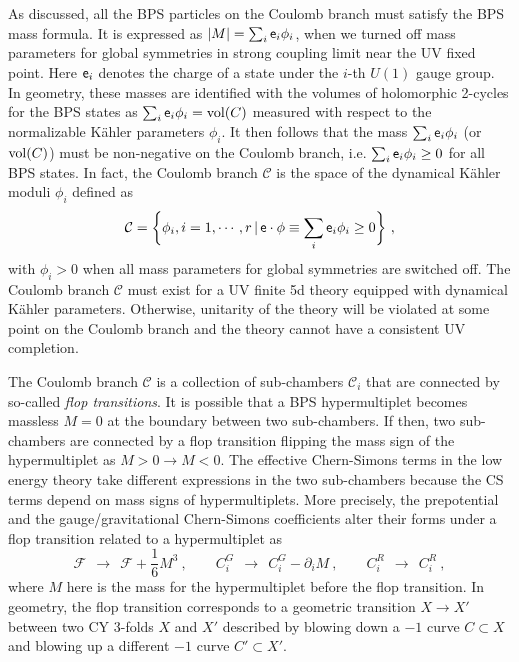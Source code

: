 As discussed, all the BPS particles on the Coulomb branch must satisfy the BPS mass formula. It is expressed as $|M|= \sum_i {\sf{e}}_i \phi_i$, when we turned off mass parameters for global symmetries in strong coupling limit near the UV fixed point. Here ${\sf{e}}_i$ denotes the charge of a state under the $i$-th $U(1)$ gauge group. In geometry, these masses are identified with the volumes of holomorphic 2-cycles for the BPS states as $\sum_i {\sf{e}}_i \phi_i={\rm vol}(C)$ measured with respect to the normalizable K\"ahler parameters $\phi_i$. It then follows that the mass $\sum_i {\sf{e}}_i \phi_i$ (or ${\rm vol}(C)$) must be non-negative on the Coulomb branch, i.e. $\sum_i {\sf{e}}_i \phi_i \ge 0$ for all BPS states. In fact, the  Coulomb branch $\mathcal{C}$ is the space of the dynamical K\"ahler moduli $\phi_i$ defined as \cite{Jefferson:2017ahm,Jefferson:2018irk}
\begin{equation}\label{eq:C-Coulomb}
	\mathcal{C} = \bigg\{\phi_i,i=1,\cdots,r\, | \,{\sf{e}}\cdot \phi\equiv\sum_i {\sf{e}}_i \phi_i \ge 0\bigg\} \ ,
\end{equation}
with $\phi_i>0$ when all mass parameters for global symmetries are switched off. The Coulomb branch $\mathcal{C}$ must exist for a UV finite 5d theory equipped with dynamical K\"ahler parameters. Otherwise, unitarity of the theory will be violated at some point on the Coulomb branch and the theory cannot have a consistent UV completion.

The Coulomb branch $\mathcal{C}$ is a collection of sub-chambers $\mathcal{C}_i$ that are connected by so-called {\it flop transitions}. It is possible that a BPS hypermultiplet becomes massless $M=0$ at the boundary between two sub-chambers. If then, two sub-chambers are connected by a flop transition flipping the mass sign of the hypermultiplet as $M>0\rightarrow M<0$. The effective Chern-Simons terms in the low energy theory take different expressions in the two sub-chambers because the CS terms depend on mass signs of hypermultiplets. More precisely, the prepotential and the gauge/gravitational Chern-Simons coefficients alter their forms under a flop transition related to a hypermultiplet as
\begin{equation}
	\mathcal{F} \ \ \rightarrow \ \ \mathcal{F} + \frac16 M^3 \ , \qquad C^G_i \ \ \rightarrow \ \ C^G_i -\partial_iM \ , \qquad C_i^R \ \ \rightarrow \ \ C_i^R \ ,
\end{equation}
where $M$ here is the mass for the hypermultiplet before the flop transition. In geometry, the flop transition corresponds to a geometric transition $X \rightarrow X'$ between two CY 3-folds $X$ and $X'$  described by blowing down a $-1$ curve $C\subset X$ and blowing up a different $-1$ curve $C'\subset X'$.

